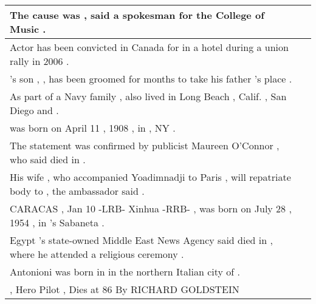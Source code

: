 \begin{longtable}{p{} P{1,3cm} }
\hline
{}  {The cause was \underline{} , said a spokesman for the \underline{} College of Music .} &    \\ 
\hline
{}  {Actor \underline{} has been convicted in Canada for \underline{} in a hotel during a union rally in 2006 .} &    \\ 
\hline
{}  {\underline{} 's son , \underline{} , has been groomed for months to take his father 's place .} &    \\ 
\hline
{}  {As part of a Navy family , \underline{} also lived in Long Beach , Calif. , San Diego and \underline{} .} &    \\ 
\hline
{}  {\underline{} was born on April 11 , 1908 , in \underline{} , NY .} &    \\ 
\hline
{}  {The statement was confirmed by publicist Maureen O'Connor , who said \underline{} died in \underline{} .} &    \\ 
\hline
{}  {His wife , who accompanied Yoadimnadji to Paris , will repatriate \underline{} body to \underline{} , the ambassador said .} &    \\ 
\hline
{}  {CARACAS , Jan 10 -LRB- Xinhua -RRB- \underline{} , was born on July 28 , 1954 , in \underline{} 's Sabaneta .} &    \\ 
\hline
{}  {Egypt 's state-owned Middle East News Agency said \underline{} died in \underline{} , where he attended a religious ceremony .} &    \\ 
\hline
{}  {Antonioni was born in \underline{} in the northern Italian city of \underline{} .} &    \\ 
\hline
{}  {\underline{} , Hero Pilot , Dies at 86 By RICHARD GOLDSTEIN} &    \\ 

\end{longtable}
